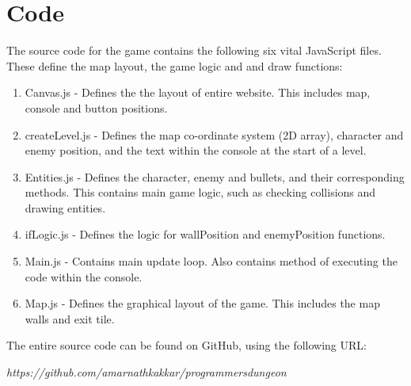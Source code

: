 \documentclass[a4paper,11.5pt]{report}
\numberwithin{figure}{section}
\numberwithin{table}{section}
\numberwithin{equation}{section}
\numberwithin{equation}{section}
\begin{document}
\chapter{Code} \label{app:code}

The source code for the game contains the following six vital JavaScript files. These define the map layout, the game logic and and draw functions:

\begin{enumerate}
	\item	 Canvas.js - Defines the the layout of entire website. This includes map, console and button positions.
	\item createLevel.js - Defines the map co-ordinate system (2D array), character and enemy position, and the text within the console at the start of a level.
	\item Entities.js - Defines the character, enemy and bullets, and their corresponding methods. This contains main game logic, such as checking collisions and drawing entities.
	\item ifLogic.js - Defines the logic for wallPosition and enemyPosition functions.
	\item Main.js - Contains main update loop. Also contains method of executing the code within the console.
	\item Map.js - Defines the graphical layout of the game. This includes the map walls and exit tile.
\end{enumerate}


The entire source code can be found on GitHub, using the following URL: 

\textit{https://github.com/amarnathkakkar/programmersdungeon}
\end{document}
